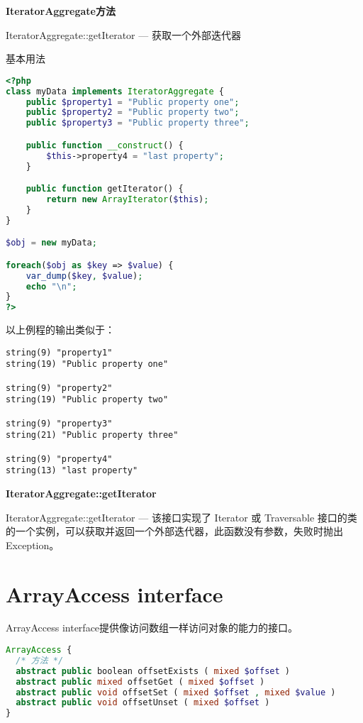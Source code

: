 \textbf{IteratorAggregate方法}

\begin{compactitem}
\item IteratorAggregate::getIterator — 获取一个外部迭代器
\end{compactitem}

\begin{example}
基本用法
\begin{lstlisting}[language=PHP]
<?php
class myData implements IteratorAggregate {
    public $property1 = "Public property one";
    public $property2 = "Public property two";
    public $property3 = "Public property three";

    public function __construct() {
        $this->property4 = "last property";
    }

    public function getIterator() {
        return new ArrayIterator($this);
    }
}

$obj = new myData;

foreach($obj as $key => $value) {
    var_dump($key, $value);
    echo "\n";
}
?>
\end{lstlisting}
\end{example}

以上例程的输出类似于：

\begin{verbatim}
string(9) "property1"
string(19) "Public property one"

string(9) "property2"
string(19) "Public property two"

string(9) "property3"
string(21) "Public property three"

string(9) "property4"
string(13) "last property"
\end{verbatim}


\textbf{IteratorAggregate::getIterator}

IteratorAggregate::getIterator — 该接口实现了 Iterator 或 Traversable 接口的类的一个实例，可以获取并返回一个外部迭代器，此函数没有参数，失败时抛出 Exception。


\section{ArrayAccess interface}


ArrayAccess interface提供像访问数组一样访问对象的能力的接口。



\begin{lstlisting}[language=PHP]
ArrayAccess {
  /* 方法 */
  abstract public boolean offsetExists ( mixed $offset )
  abstract public mixed offsetGet ( mixed $offset )
  abstract public void offsetSet ( mixed $offset , mixed $value )
  abstract public void offsetUnset ( mixed $offset )
}
\end{lstlisting}

